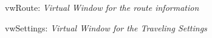\begin{figure}
\begin{center}
  \caption{vwRoute: \emph{Virtual Window for the route information}} \label{pic:vwRoute}
\end{center}    
\end{figure}


\begin{figure}
\begin{center}
  \caption{vwSettings: \emph{Virtual Window for the Traveling Settings}} \label{pic:vwSettings}
\end{center}    
\end{figure}

